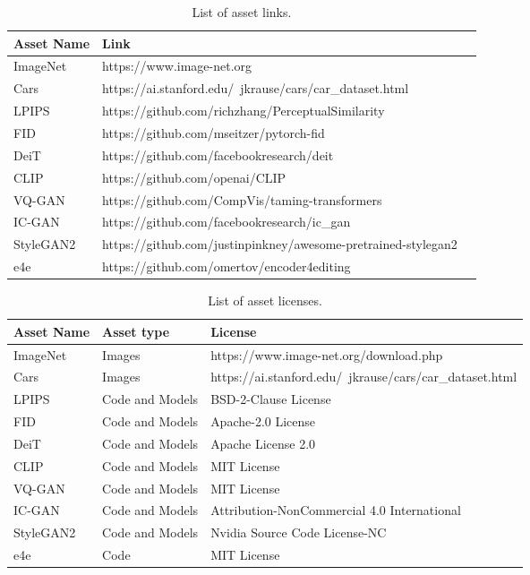 \begin{table*}[h]
\hspace{\sizeforappendix}
\small
\begin{tabular}{lll}
\toprule
\textbf{Asset Name} & \textbf{Link} \\
\midrule
ImageNet & https://www.image-net.org \\
Cars & https://ai.stanford.edu/~jkrause/cars/car\_dataset.html \\
LPIPS & https://github.com/richzhang/PerceptualSimilarity \\
FID & https://github.com/mseitzer/pytorch-fid \\
DeiT & https://github.com/facebookresearch/deit \\
CLIP & https://github.com/openai/CLIP \\
VQ-GAN & https://github.com/CompVis/taming-transformers \\
IC-GAN & https://github.com/facebookresearch/ic\_gan \\
StyleGAN2 & https://github.com/justinpinkney/awesome-pretrained-stylegan2 \\
e4e & https://github.com/omertov/encoder4editing \\
\bottomrule
\end{tabular}
\caption{List of asset links.}
\label{tab:links}
\end{table*}

\begin{table*}[h]
\hspace{\sizeforappendix}
\small
\begin{tabular}{lll}
\toprule
\textbf{Asset Name} & \textbf{Asset type} & \textbf{License} \\
\midrule
ImageNet & Images & https://www.image-net.org/download.php \\
Cars & Images & https://ai.stanford.edu/~jkrause/cars/car\_dataset.html\\
LPIPS & Code and Models & BSD-2-Clause License \\
FID & Code and Models & Apache-2.0 License \\
DeiT & Code and Models & Apache License 2.0 \\
CLIP & Code and Models & MIT License \\
VQ-GAN & Code and Models & MIT License \\
IC-GAN & Code and Models & Attribution-NonCommercial 4.0 International \\
StyleGAN2 & Code and Models & Nvidia Source Code License-NC \\
e4e & Code &  MIT License \\
\bottomrule
\end{tabular}
\caption{List of asset licenses.}
\label{tab:licences}
\end{table*}

